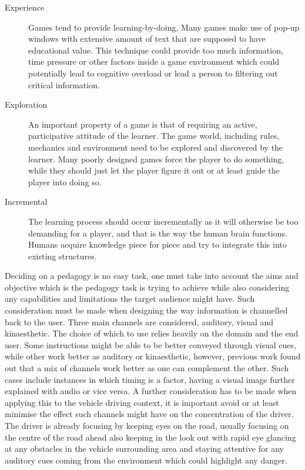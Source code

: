 \begin{description}
\item[Experience] Games tend to provide learning-by-doing, Many games make use of pop-up windows with extensive amount of text that are supposed to have educational value. This technique could provide too much information, time pressure or other factors inside a game environment which could potentially lead to cognitive overload or lead a person to filtering out critical information\cite{egenfeldt2005beyond}.

\item[Exploration] An important property of a game is that of requiring an active, participative attitude of the learner. The game world, including rules, mechanics and environment need to be explored and discovered by the learner. Many poorly designed games force the player to do something, while they should just let the player figure it out or at least guide the player into doing so.

\item[Incremental] The learning process should occur incrementally as it will otherwise be too demanding for a player, and that is the way the human brain functions. Humans acquire knowledge piece for piece and try to integrate this into existing structures\cite{moser2002methodology}.
\end{description}

Deciding on a pedagogy is no easy task, one must take into account the aims and objective which is the pedagogy task is trying to achieve while also considering any capabilities and limitations the target audience might have. Such consideration must be made when designing the way information is channelled back to the user. Three main channels are considered, auditory, visual and kinaesthetic. The choice of which to use relies heavily on the domain and the end user. Some instructions might be able to be better conveyed through visual cues, while other work better as auditory or kinaesthetic, however, previous work found out that a mix of channels work better as one can complement the other\cite{leahy2003auditory}. Such cases include instances in which timing is a factor, having a visual image further explained with audio or vice versa. A further consideration has to be made when applying this to the vehicle driving context, it is important avoid or at least minimise the effect such channels might have on the concentration of the driver. The driver is already focusing by keeping eyes on the road, usually focusing on the centre of the road ahead also keeping in the look out with rapid eye glancing at any obstacles in the vehicle surrounding area and staying attentive for any auditory cues coming from the environment which could highlight any danger\cite{engstrom2005effects}. 

